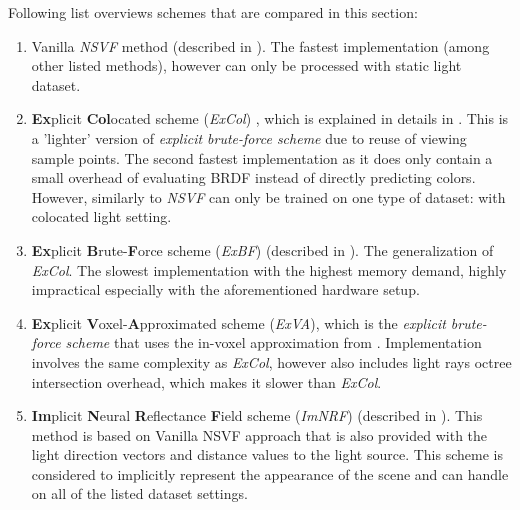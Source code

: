 Following list overviews schemes that are compared in this section:
\begin{enumerate}
    \item Vanilla \textit{NSVF} method \cite{liu2021neural} (described in ).
    The fastest implementation (among other listed methods),
    however can only be processed with static light dataset.
    \item \textbf{Ex}plicit \textbf{Col}ocated scheme (\textit{ExCol}) \cite{bi2020neural, liu2021neural}, which is explained in details in .
    This is a 'lighter' version of \textit{explicit brute-force scheme}
    due to reuse of viewing sample points.
    The second fastest implementation as it does only contain
    a small overhead of evaluating BRDF instead of directly predicting colors.
    However, similarly to \textit{NSVF} can only be trained on one type of dataset: with colocated light setting.
    \item \textbf{Ex}plicit \textbf{B}rute-\textbf{F}orce scheme (\textit{ExBF}) (described in ).
    The generalization of \textit{ExCol}.
    The slowest implementation with the highest memory demand,
    highly impractical especially with the aforementioned hardware setup.
    \item \textbf{Ex}plicit \textbf{V}oxel-\textbf{A}pproximated scheme (\textit{ExVA}), which is the \textit{explicit brute-force scheme}
    that uses the in-voxel approximation from .
    Implementation involves the same complexity as \textit{ExCol},
    however also includes light rays octree intersection overhead,
    which makes it slower than \textit{ExCol}.
    \item \textbf{Im}plicit \textbf{N}eural \textbf{R}eflectance \textbf{F}ield scheme (\textit{ImNRF}) (described in ).
    This method is based on Vanilla NSVF approach
    that is also provided with the light direction vectors and distance values to the light source.
    This scheme is considered to implicitly represent the appearance of the scene
    and can handle on all of the listed dataset settings.
\end{enumerate}




